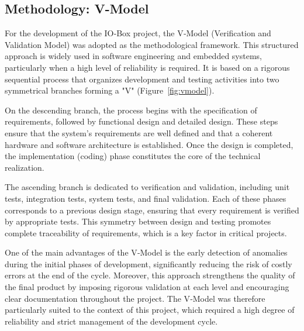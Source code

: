 \subsection{Methodology: V-Model}

For the development of the IO‑Box project, the V‑Model (Verification and Validation
Model) was adopted as the methodological framework. This structured approach is
widely used in software engineering and embedded systems, particularly when a high
level of reliability is required. It is based on a rigorous sequential process that organizes
development and testing activities into two symmetrical branches forming a "V"
(Figure~\ref{fig:vmodel}).

On the descending branch, the process begins with the specification of requirements,
followed by functional design and detailed design. These steps ensure that the system’s
requirements are well defined and that a coherent hardware and software architecture
is established. Once the design is completed, the implementation (coding) phase
constitutes the core of the technical realization.

The ascending branch is dedicated to verification and validation, including unit tests,
integration tests, system tests, and final validation. Each of these phases corresponds
to a previous design stage, ensuring that every requirement is verified by appropriate
tests. This symmetry between design and testing promotes complete traceability of
requirements, which is a key factor in critical projects.

One of the main advantages of the V‑Model is the early detection of anomalies during
the initial phases of development, significantly reducing the risk of costly errors at the
end of the cycle. Moreover, this approach strengthens the quality of the final product
by imposing rigorous validation at each level and encouraging clear documentation
throughout the project. The V‑Model was therefore particularly suited to the context of
this project, which required a high degree of reliability and strict management of the
development cycle.

